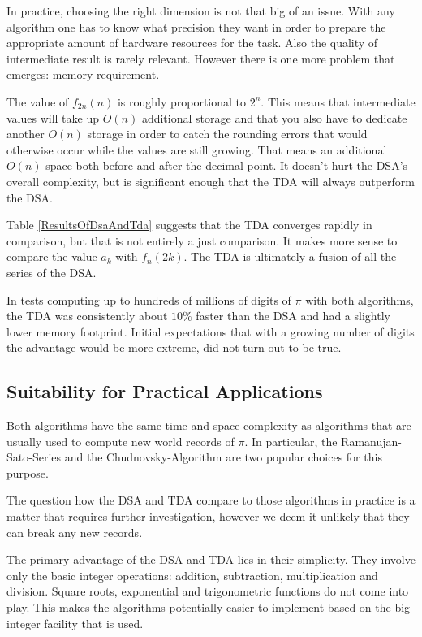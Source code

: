 \documentclass[a4paper,11pt]{scrartcl}
\theoremstyle{definition}
\theoremstyle{plain}
\theoremstyle{remark}
\begin{document}
In practice, choosing the right dimension is not that big of an issue.
With any algorithm one has to know what precision they want in order to prepare the appropriate amount of hardware resources for the task.
Also the quality of intermediate result is rarely relevant.
However there is one more problem that emerges: memory requirement.

The value of $f_{2n}(n)$ is roughly proportional to $2^n$.
This means that intermediate values will take up $O(n)$ additional storage and that you also have to dedicate another $O(n)$ storage in order to catch the rounding errors that would otherwise occur while the values are still growing.
That means an additional $O(n)$ space both before and after the decimal point.
It doesn't hurt the DSA's overall complexity, but is significant enough that the TDA will always outperform the DSA.

Table \ref{ResultsOfDsaAndTda} suggests that the TDA converges rapidly in comparison, but that is not entirely a just comparison.
It makes more sense to compare the value $a_k$ with $f_n(2k)$.
The TDA is ultimately a fusion of all the series of the DSA.

In tests computing up to hundreds of millions of digits of $\pi$ with both algorithms, the TDA was consistently about $10\%$ faster than the DSA and had a slightly lower memory footprint.
Initial expectations that with a growing number of digits the advantage would be more extreme, did not turn out to be true.

\subsection{Suitability for Practical Applications}

Both algorithms have the same time and space complexity as algorithms that are usually used to compute new world records of $\pi$.
In particular, the Ramanujan-Sato-Series and the Chudnovsky-Algorithm are two popular choices for this purpose.

The question how the DSA and TDA compare to those algorithms in practice is a matter that requires further investigation, however we deem it unlikely that they can break any new records.

The primary advantage of the DSA and TDA lies in their simplicity.
They involve only the basic integer operations: addition, subtraction, multiplication and division.
Square roots, exponential and trigonometric functions do not come into play.
This makes the algorithms potentially easier to implement based on the big-integer facility that is used.
\end{document}

